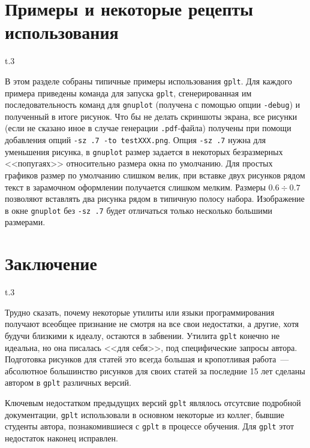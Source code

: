 \documentclass[12pt]{article}
\def\gplt{{\tt gplt}}
\def\gnuplot{{\tt gnuplot}}
\def\pdf{{\tt .pdf}}
\begin{document}
\section{Примеры и некоторые рецепты использования}
\begin{wrapfigure}[7]{t}{.3\textwidth}
  \vphantom{.}
  \vspace{-1cm}

\end{wrapfigure}
В этом разделе собраны типичные примеры использования \gplt.
Для каждого примера приведены команда для запуска \gplt, сгенерированная им последовательность команд
для \gnuplot{} (получена с помощью опции \verb'-debug') и полученный в итоге рисунок.
Что бы не делать скриншоты экрана, все рисунки (если не сказано иное в случае генерации \pdf-файла) получены при помощи добавления
опций \verb'-sz .7 -to testXXX.png'. Опция \verb'-sz .7' нужна для уменьшения рисунка,
в \gnuplot{} размер задается в некоторых безразмерных <<попугаях>> относительно размера окна по умолчанию.
Для простых графиков размер по умолчанию слишком велик, при вставке двух рисунков рядом текст
в зарамочном оформлении получается слишком мелким. Размеры $0.6\div0.7$ позволяют вставлять два рисунка рядом в типичную полосу набора. 
Изображение в окне \gnuplot{} без \verb'-sz .7' будет отличаться только несколько большими размерами.



\section{Заключение}
\begin{wrapfigure}[7]{t}{.3\textwidth}
  \vphantom{.}
  \vspace{-2.3cm}

\end{wrapfigure}

Трудно сказать, почему некоторые утилиты или языки программирования  получают всеобщее признание не смотря на все свои недостатки,
а другие, хотя будучи близкими к идеалу, остаются в забвении. 
Утилита \gplt{} конечно не идеальна, но она писалась <<для себя>>, под специфические запросы автора.
Подготовка рисунков для статей это всегда большая и кропотливая работа~---
абсолютное большинство рисунков для своих статей за последние 15 лет сделаны автором в \verb'gplt' различных версий.

Ключевым недостатком предыдущих версий \verb'gplt' являлось отсутсвие подробной документации,
\verb'gplt' использовали в основном некоторые из коллег, бывшие студенты автора, познакомившиеся с \verb'gplt'
в процессе обучения. Для \gplt{}  этот недостаток наконец исправлен. 



\end{document}
